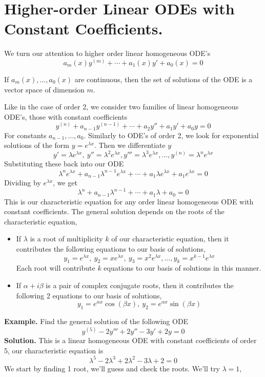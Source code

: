 \documentclass[openany]{report}
\begin{document}
\section{Higher-order Linear ODEs with Constant Coefficients.}
We turn our attention to higher order linear homogeneous ODE's \
\[a_m(x)y^{(m)} + \cdots + a_1(x)y' + a_0(x) = 0\]
\begin{theorem}
    If $a_m(x), \ldots, a_0(x)$ are continuous, then the set of solutions of the ODE is a vector space of dimension $m$.
\end{theorem}
Like in the case of order 2, we consider two families of linear homogeneous ODE's, those with constant coefficients 
\[y^{(n)} + a_{n-1}y^{(n-1)} + \cdots + a_2y'' + a_1 y' + a_0y = 0\]
For constants $a_{n-1}, \ldots, a_0$.  Similarly to ODE's of order 2, we look for exponential solutions of the form $y = e^{\lambda x}$. Then we differentiate $y$ 
\[y' = \lambda e^{\lambda x}, \ y'' = \lambda^2 e^{\lambda x}, y''' =  \lambda^3e^{\lambda x},\ldots, y^{(n)} = \lambda^n e^{\lambda x}\]
Substituting these back into our ODE 
\[\lambda^ne^{\lambda x} + a_{n-1}\lambda^{n-1}e^{\lambda x } + \cdots + a_1\lambda e^{\lambda x} + a_1e^{\lambda x } = 0\]
Dividing by $e^{\lambda x}$, we get
\[\lambda^n + a_{n-1}\lambda^{n-1} + \cdots + a_1\lambda + a_0 = 0\]
This is our characteristic equation for any order linear homogeneous ODE with constant coefficients. The general solution depends on the roots of the characteristic equation, 
\begin{itemize}
    \item If $\lambda$ is a root of multiplicity $k$ of our characteristic equation, then it contributes the following equations to our basis of solutions, 
    \[y_1 = e^{\lambda x}, \ y_2 = xe^{\lambda x}, \ y_3 = x^2e^{\lambda x}, \ldots, y_k = x^{k-1}e^{\lambda x}\]
    Each root will contribute $k$ equations to our basis of solutions in this manner.
    \item If $\alpha + i\beta$ is a pair of complex conjugate roots, then it contributes the following 2 equations to our basis of solutions,
    \[y_1 = e^{\alpha x}\cos(\beta x), \ y_2 = e^{\alpha x}\sin(\beta x)\]
\end{itemize} 
\textbf{Example.} Find the general solution of the following ODE 
\[y^{(5)} - 2y''' + 2y'' - 3y' + 2y = 0\]
\textbf{Solution.} This is a linear homogeneous ODE with constant coefficients of order 5, our characteristic equation is 
\[\lambda^5 - 2 \lambda^3 + 2\lambda^2 - 3\lambda + 2 = 0\]
We start by finding 1 root, we'll guess and check the roots. We'll try $\lambda = 1$,
\end{document}
